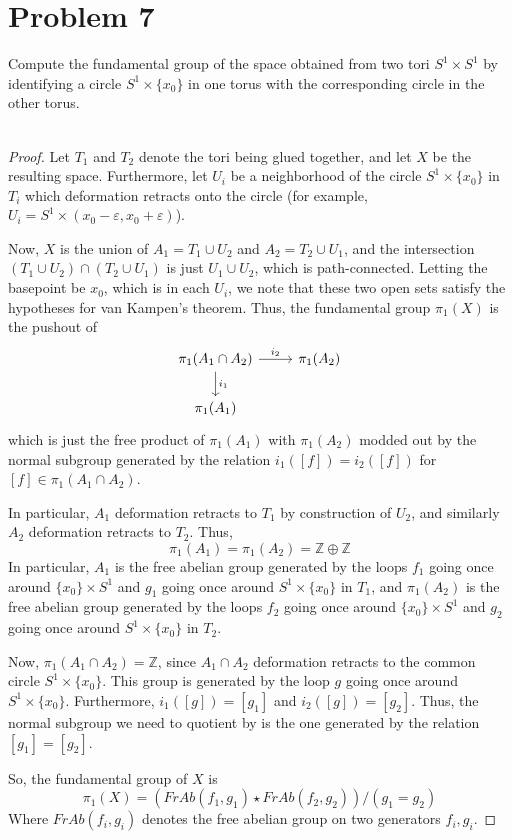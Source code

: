 \documentclass[fontsize=11pt]{scrartcl} %
\numberwithin{equation}{section} %
\numberwithin{figure}{section} %
\numberwithin{table}{section} %
\newcommand{\Z}{\mathbb{Z}}
\begin{document}
\section*{Problem 7}
Compute the fundamental group of the space obtained from two tori $S^1\times
S^1$ by identifying a circle $S^1\times \{x_0\}$ in one torus with the
corresponding circle in the other torus.
\\
\\
\begin{proof}
    Let $T_1$ and $T_2$ denote the tori being glued together, and let $X$ be the
    resulting space.
    Furthermore, let $U_i$ be a neighborhood of the circle $S^1\times \{x_0\}$
    in $T_i$ which deformation retracts onto the circle (for example, $U_i =
    S^1\times (x_0-\varepsilon,x_0+\varepsilon)$).

    Now, $X$ is the union of $A_1 = T_1\cup U_2$ and $A_2 = T_2\cup U_1$, and the
    intersection $(T_1\cup U_2) \cap (T_2\cup U_1)$ is just $U_1\cup U_2$, which
    is path-connected. Letting the basepoint be $x_0$, which is in each $U_i$,
    we note that these two open sets satisfy the hypotheses for van Kampen's
    theorem. Thus, the fundamental group $\pi_1(X)$ is the pushout of
    \[
        \begin{tikzcd}
            \pi_1(A_1\cap A_2)\arrow{d}{i_1}\arrow{r}{i_2} &\pi_1(A_2)\\
            \pi_1(A_1)
        \end{tikzcd}
    \]
    which is just the free product of $\pi_1(A_1)$ with $\pi_1(A_2)$ modded out
    by the normal subgroup generated by the relation $i_1([f]) = i_2([f])$ for
    $[f]\in \pi_1(A_1\cap A_2)$.

    In particular, $A_1$ deformation retracts to $T_1$ by construction of
    $U_2$, and similarly $A_2$ deformation retracts to $T_2$. Thus,
    \[
        \pi_1(A_1) = \pi_1(A_2) = \Z\oplus\Z
    \]
    In particular, $A_1$ is the free abelian group
    generated by the loops $f_1$ going once around $\{x_0\}\times S^1$ and $g_1$
    going once around $S^1\times \{x_0\}$ in
    $T_1$, and $\pi_1(A_2)$ is the free abelian group generated by the loops $f_2$
    going once around $\{x_0\}\times S^1$ and $g_2$ going once around $S^1\times
    \{x_0\}$ in $T_2$. 

    Now, $\pi_1(A_1\cap A_2) = \Z$, since $A_1\cap A_2$ deformation retracts to
    the common circle $S^1\times \{x_0\}$. This group is generated by the loop
    $g$ going once around $S^1\times \{x_0\}$. Furthermore, $i_1([g]) = [g_1]$
    and $i_2([g]) = [g_2]$. Thus, the normal subgroup we need to quotient by is
    the one generated by the relation $[g_1] = [g_2]$.

    So, the fundamental group of $X$ is
    \[
        \pi_1(X) = (FrAb(f_1,g_1)\star FrAb(f_2,g_2))/{(g_1=g_2)}
    \]
    Where $FrAb(f_i,g_i)$ denotes the free abelian group on two generators
    $f_i,g_i$.

\end{proof}
\end{document}
